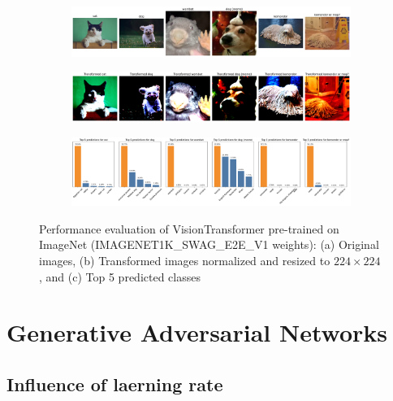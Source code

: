 \begin{figure}[H]
    \centering
    \begin{subfigure}{0.95\textwidth}
        \includegraphics[width=\textwidth]{original_images_vit_bis}
        \caption{}
        \label{subfig:original_images_vit_bis}
    \end{subfigure}
    \begin{subfigure}{0.95\textwidth}
        \includegraphics[width=\textwidth]{transformed_images_vit_bis}
        \caption{}
        \label{subfig:transformed_images_vit_bis}
    \end{subfigure}
    \begin{subfigure}{0.95\textwidth}
        \includegraphics[width=\textwidth]{prediction_plots_vit_bis}
        \caption{}
        \label{subfig:prediction_plots_vit_bis}
    \end{subfigure}
    \caption{Performance evaluation of VisionTransformer pre-trained on ImageNet (IMAGENET1K\_SWAG\_E2E\_V1 weights): (a) Original images, (b) Transformed images normalized and resized to $224 \times 224$, and (c) Top 5 predicted classes}
    \label{fig:vit_refined}
\end{figure}

\section{Generative Adversarial Networks}
\graphicspath{{figs/2de/}}

\subsection{Influence of laerning rate} \label{appendix:gan_lr}

